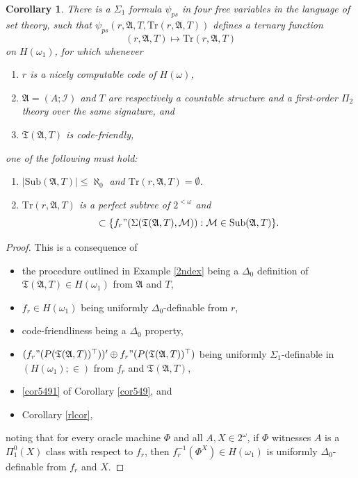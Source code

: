 \documentclass[12pt, twoside]{memoir}
\numberwithin{equation}{section}
\newtheorem{cor}[thm]{Corollary}
\theoremstyle{definition}
\theoremstyle{remark}
\theoremstyle{definition}
\theoremstyle{definition}
\theoremstyle{definition}
\theoremstyle{remark}
\begin{document}
\begin{cor}\label{rlcor2nd}
There is a $\Sigma_1$ formula $\psi_{ps}$ in four free variables in the language of set theory, such that $\psi_{ps}(r, \mathfrak{A}, T, \mathrm{Tr}(r, \mathfrak{A}, T))$ defines a ternary function $$(r, \mathfrak{A}, T) \mapsto \mathrm{Tr}(r, \mathfrak{A}, T)$$ on $H(\omega_1)$, for which whenever 
\begin{enumerate}[label=(\alph*)]
    \item $r$ is a nicely computable code of $H(\omega)$,
    \item $\mathfrak{A} = (A; \mathcal{I})$ and $T$ are respectively a countable structure and a first-order $\Pi_2$ theory over the same signature, and
    \item $\mathfrak{T}(\mathfrak{A}, T)$ is code-friendly,
\end{enumerate} 
one of the following must hold:
\begin{enumerate}[label=(\arabic*)]
    \item $|\mathrm{Sub}(\mathfrak{A}, T)| \leq \aleph_0$ and $\mathrm{Tr}(r, \mathfrak{A}, T) = \emptyset$.
    \item $\mathrm{Tr}(r, \mathfrak{A}, T)$ is a perfect subtree of $2^{< \omega}$ and
    \begin{equation*}
        [\mathrm{Tr}(r, \mathfrak{A}, T)] \subset \{f_r" (\Sigma(\mathfrak{T}(\mathfrak{A}, T), \mathcal{M})) : \mathcal{M} \in \mathrm{Sub}(\mathfrak{A}, T)\} \text{.}
    \end{equation*}
\end{enumerate}
\end{cor}

\begin{proof}
This is a consequence of
\begin{itemize}
    \item the procedure outlined in Example \ref{2ndex} being a $\Delta_0$ definition of $\mathfrak{T}(\mathfrak{A}, T) \in H(\omega_1)$ from $\mathfrak{A}$ and $T$,
    \item $f_r \in H(\omega_1)$ being uniformly $\Delta_0$-definable from $r$,
    \item code-friendliness being a $\Delta_0$ property,
    \item $(f_r" (P(\mathfrak{T}(\mathfrak{A}, T))^{\top}))' \oplus f_r" (P(\mathfrak{T}(\mathfrak{A}, T))^{\top})$ being uniformly $\Sigma_1$-definable in \\ $(H(\omega_1); \in)$ from $f_r$ and $\mathfrak{T}(\mathfrak{A}, T)$, 
    \item \ref{cor5491} of Corollary \ref{cor549}, and
    \item Corollary \ref{rlcor},
\end{itemize}
noting that for every oracle machine $\Phi$ and all $A, X \in 2^{\omega}$, if $\Phi$ witnesses $A$ is a $\Pi^0_1(X)$ class with respect to $f_r$, then $f_r^{-1}(\Phi^X) \in H(\omega_1)$ is uniformly $\Delta_0$-definable from $f_r$ and $X$.
\end{proof}
\end{document}
